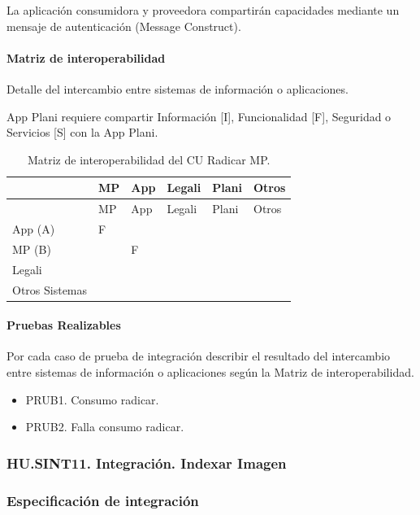 \documentclass[
  paper=a4,
  ,captions=tableheading
]{scrartcl}
\providecommand{\tightlist}{%
  \setlength{\itemsep}{0pt}\setlength{\parskip}{0pt}}
\begin{document}
La aplicación consumidora y proveedora compartirán capacidades mediante
un mensaje de autenticación (Message Construct).

\paragraph{Matriz de
interoperabilidad}\label{sec:matriz-de-interoperabilidad}

Detalle del intercambio entre sistemas de información o aplicaciones.

App Plani requiere compartir Información {[}I{]}, Funcionalidad {[}F{]},
Seguridad o Servicios {[}S{]} con la App Plani.

\begin{longtable}[]{@{}llllll@{}}
\caption{Matriz de interoperabilidad del CU Radicar MP.}\tabularnewline
\toprule\noalign{}
& MP & App & Legali & Plani & Otros \\
\midrule\noalign{}
\endfirsthead
\toprule\noalign{}
& MP & App & Legali & Plani & Otros \\
\midrule\noalign{}
\endhead
\bottomrule\noalign{}
\endlastfoot
App (A) & F & & & & \\
MP (B) & & F & & & \\
Legali & & & & & \\
Otros Sistemas & & & & & \\
\end{longtable}

\paragraph{Pruebas Realizables}\label{sec:pruebas-realizables}

Por cada caso de prueba de integración describir el resultado del
intercambio entre sistemas de información o aplicaciones según la Matriz
de interoperabilidad.

\begin{itemize}
\tightlist
\item
  PRUB1. Consumo radicar.
\item
  PRUB2. Falla consumo radicar.
\end{itemize}

\subsubsection{HU.SINT11. Integración. Indexar
Imagen}\label{sec:hu.sint11.-integraciuxf3n.-indexar-imagen}

\subsubsection{Especificación de
integración}\label{sec:especificaciuxf3n-de-integraciuxf3n-1}
\end{document}
